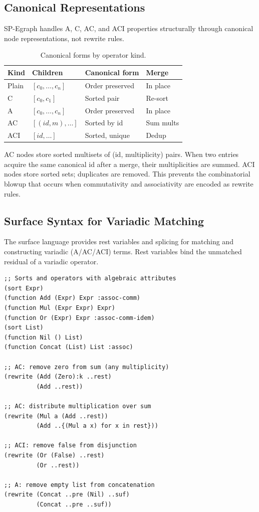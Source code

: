 \documentclass[sigplan,nonacm]{acmart}
\begin{document}
\subsection{Canonical Representations}

SP-Egraph handles A, C, AC, and ACI properties structurally through
canonical node representations, not rewrite rules.

\begin{table}[t]
\caption{Canonical forms by operator kind.}
\label{tab:canon}
\begin{tabular}{@{}llll@{}}
\toprule
Kind & Children & Canonical form & Merge \\
\midrule
Plain & $[c_0, \ldots, c_n]$ & Order preserved & In place \\
C     & $[c_0, c_1]$         & Sorted pair     & Re-sort \\
A     & $[c_0, \ldots, c_n]$ & Order preserved & In place \\
AC    & $[(id, m), \ldots]$  & Sorted by id    & Sum mults \\
ACI   & $[id, \ldots]$       & Sorted, unique  & Dedup \\
\bottomrule
\end{tabular}
\end{table}

AC nodes store sorted multisets of (id, multiplicity) pairs.  When
two entries acquire the same canonical id after a merge, their
multiplicities are summed.  ACI nodes store sorted sets; duplicates
are removed.  This prevents the combinatorial blowup that occurs
when commutativity and associativity are encoded as rewrite rules.

\subsection{Surface Syntax for Variadic Matching}

The surface language provides rest variables and splicing for
matching and constructing variadic (A/AC/ACI) terms.  Rest variables
bind the unmatched residual of a variadic operator.

\begin{lstlisting}
;; Sorts and operators with algebraic attributes
(sort Expr)
(function Add (Expr) Expr :assoc-comm)
(function Mul (Expr Expr) Expr)
(function Or (Expr) Expr :assoc-comm-idem)
(sort List)
(function Nil () List)
(function Concat (List) List :assoc)

;; AC: remove zero from sum (any multiplicity)
(rewrite (Add (Zero):k ..rest)
         (Add ..rest))

;; AC: distribute multiplication over sum
(rewrite (Mul a (Add ..rest))
         (Add ..{(Mul a x) for x in rest}))

;; ACI: remove false from disjunction
(rewrite (Or (False) ..rest)
         (Or ..rest))

;; A: remove empty list from concatenation
(rewrite (Concat ..pre (Nil) ..suf)
         (Concat ..pre ..suf))
\end{lstlisting}
\end{document}
